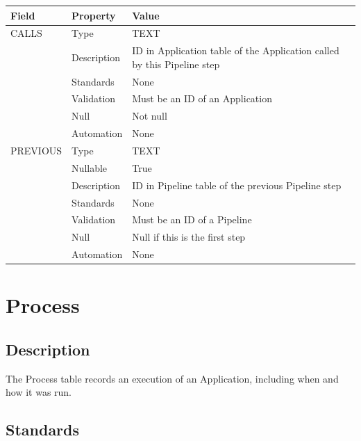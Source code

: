 \begin{longtable}[]{@{}
  >{\raggedright\arraybackslash}p{}
  >{\raggedright\arraybackslash}p{}
  >{\raggedright\arraybackslash}p{}@{}}
\toprule\noalign{}
\begin{minipage}[b]{\linewidth}\raggedright
Field
\end{minipage} & \begin{minipage}[b]{\linewidth}\raggedright
Property
\end{minipage} & \begin{minipage}[b]{\linewidth}\raggedright
Value
\end{minipage} \\
\midrule\noalign{}
\endhead
\bottomrule\noalign{}
\endlastfoot
CALLS & Type & TEXT \\
& Description & ID in Application table of the Application called by
this Pipeline step \\
& Standards & None \\
& Validation & Must be an ID of an Application \\
& Null & Not null \\
& Automation & None \\
PREVIOUS & Type & TEXT \\
& Nullable & True \\
& Description & ID in Pipeline table of the previous Pipeline step \\
& Standards & None \\
& Validation & Must be an ID of a Pipeline \\
& Null & Null if this is the first step \\
& Automation & None \\
\end{longtable}

\section{Process}\label{process}

\subsection{Description}\label{description-23}

The Process table records an execution of an Application, including when
and how it was run.

\subsection{Standards}\label{standards-25}

